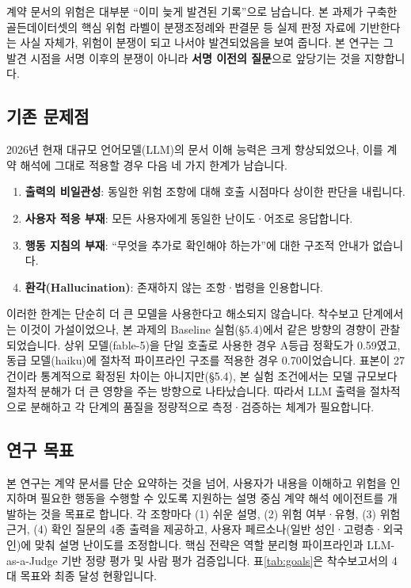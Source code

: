 \documentclass[10pt,a4paper]{article}
\begin{document}
계약 문서의 위험은 대부분 ``이미 늦게 발견된 기록''으로 남습니다. 본 과제가 구축한 골든데이터셋의 핵심 위험 라벨이 분쟁조정례와 판결문 등 실제 판정 자료에 기반한다는 사실 자체가, 위험이 분쟁이 되고 나서야 발견되었음을 보여 줍니다. 본 연구는 그 발견 시점을 서명 이후의 분쟁이 아니라 \textbf{서명 이전의 질문}으로 앞당기는 것을 지향합니다.

\subsection{기존 문제점}
2026년 현재 대규모 언어모델(LLM)의 문서 이해 능력은 크게 향상되었으나, 이를 계약 해석에 그대로 적용할 경우 다음 네 가지 한계가 남습니다.
\begin{enumerate}
\item \textbf{출력의 비일관성}: 동일한 위험 조항에 대해 호출 시점마다 상이한 판단을 내립니다.
\item \textbf{사용자 적응 부재}: 모든 사용자에게 동일한 난이도·어조로 응답합니다.
\item \textbf{행동 지침의 부재}: ``무엇을 추가로 확인해야 하는가''에 대한 구조적 안내가 없습니다.
\item \textbf{환각(Hallucination)}: 존재하지 않는 조항·법령을 인용합니다.
\end{enumerate}
이러한 한계는 단순히 더 큰 모델을 사용한다고 해소되지 않습니다. 착수보고 단계에서는 이것이 가설이었으나, 본 과제의 Baseline 실험(\S5.4)에서 같은 방향의 경향이 관찰되었습니다. 상위 모델(fable-5)을 단일 호출로 사용한 경우 A등급 정확도가 0.59였고, 동급 모델(haiku)에 절차적 파이프라인 구조를 적용한 경우 0.70이었습니다. 표본이 27건이라 통계적으로 확정된 차이는 아니지만(\S5.4), 본 실험 조건에서는 모델 규모보다 절차적 분해가 더 큰 영향을 주는 방향으로 나타났습니다. 따라서 LLM 출력을 절차적으로 분해하고 각 단계의 품질을 정량적으로 측정·검증하는 체계가 필요합니다.

\subsection{연구 목표}
본 연구는 계약 문서를 단순 요약하는 것을 넘어, 사용자가 내용을 이해하고 위험을 인지하며 필요한 행동을 수행할 수 있도록 지원하는 설명 중심 계약 해석 에이전트를 개발하는 것을 목표로 합니다. 각 조항마다 (1) 쉬운 설명, (2) 위험 여부·유형, (3) 위험 근거, (4) 확인 질문의 4종 출력을 제공하고, 사용자 페르소나(일반 성인·고령층·외국인)에 맞춰 설명 난이도를 조정합니다. 핵심 전략은 역할 분리형 파이프라인과 LLM-as-a-Judge 기반 정량 평가 및 사람 평가 검증입니다. 표\ref{tab:goals}은 착수보고서의 4대 목표와 최종 달성 현황입니다.
\end{document}
